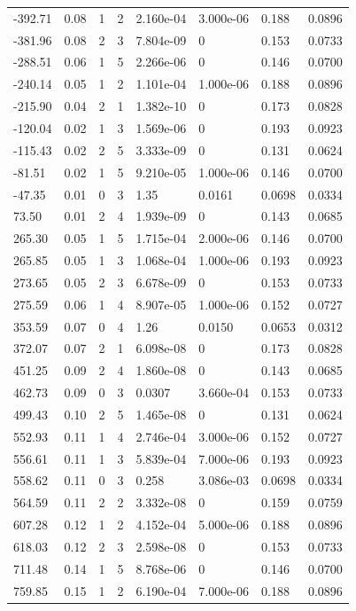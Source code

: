 \documentclass[preview]{standalone}
\begin{document}
{{\begin{tabular}{L{1.2cm}C{1.2cm} C{0.3cm}C{0.5cm} C{1.4cm}C{1.4cm} C{1.4cm}C{1.4cm}}
  -392.71  &  0.08  & 1     &  2 &  2.160e-04  & 3.000e-06  & 0.188 &  0.0896   \\ 
  -381.96  &  0.08  & 2     &  3 &  7.804e-09  & 0  & 0.153 &  0.0733   \\ 
  -288.51  &  0.06  & 1     &  5 &  2.266e-06  & 0  & 0.146 &  0.0700   \\ 
  -240.14  &  0.05  & 1     &  2 &  1.101e-04  & 1.000e-06  & 0.188 &  0.0896   \\ 
  -215.90  &  0.04  & 2     &  1 &  1.382e-10  & 0  & 0.173 &  0.0828   \\ 
  -120.04  &  0.02  & 1     &  3 &  1.569e-06  & 0  & 0.193 &  0.0923   \\ 
  -115.43  &  0.02  & 2     &  5 &  3.333e-09  & 0  & 0.131 &  0.0624   \\ 
  -81.51  &  0.02  & 1     &  5 &  9.210e-05  & 1.000e-06  & 0.146 &  0.0700   \\ 
  -47.35  &  0.01  & 0     &  3 &  1.35  & 0.0161  & 0.0698 &  0.0334   \\ 
  73.50  &  0.01  & 2     &  4 &  1.939e-09  & 0  & 0.143 &  0.0685   \\ 
  265.30  &  0.05  & 1     &  5 &  1.715e-04  & 2.000e-06  & 0.146 &  0.0700   \\ 
  265.85  &  0.05  & 1     &  3 &  1.068e-04  & 1.000e-06  & 0.193 &  0.0923   \\ 
  273.65  &  0.05  & 2     &  3 &  6.678e-09  & 0  & 0.153 &  0.0733   \\ 
  275.59  &  0.06  & 1     &  4 &  8.907e-05  & 1.000e-06  & 0.152 &  0.0727   \\ 
  353.59  &  0.07  & 0     &  4 &  1.26  & 0.0150  & 0.0653 &  0.0312   \\ 
  372.07  &  0.07  & 2     &  1 &  6.098e-08  & 0  & 0.173 &  0.0828   \\ 
  451.25  &  0.09  & 2     &  4 &  1.860e-08  & 0  & 0.143 &  0.0685   \\ 
  462.73  &  0.09  & 0     &  3 &  0.0307  & 3.660e-04  & 0.153 &  0.0733   \\ 
  499.43  &  0.10  & 2     &  5 &  1.465e-08  & 0  & 0.131 &  0.0624   \\ 
  552.93  &  0.11  & 1     &  4 &  2.746e-04  & 3.000e-06  & 0.152 &  0.0727   \\ 
  556.61  &  0.11  & 1     &  3 &  5.839e-04  & 7.000e-06  & 0.193 &  0.0923   \\ 
  558.62  &  0.11  & 0     &  3 &  0.258  & 3.086e-03  & 0.0698 &  0.0334   \\ 
  564.59  &  0.11  & 2     &  2 &  3.332e-08  & 0  & 0.159 &  0.0759   \\ 
  607.28  &  0.12  & 1     &  2 &  4.152e-04  & 5.000e-06  & 0.188 &  0.0896   \\ 
  618.03  &  0.12  & 2     &  3 &  2.598e-08  & 0  & 0.153 &  0.0733   \\ 
  711.48  &  0.14  & 1     &  5 &  8.768e-06  & 0  & 0.146 &  0.0700   \\ 
  759.85  &  0.15  & 1     &  2 &  6.190e-04  & 7.000e-06  & 0.188 &  0.0896   \\ 
\hline 
\end{tabular} 

}}
\end{document}
